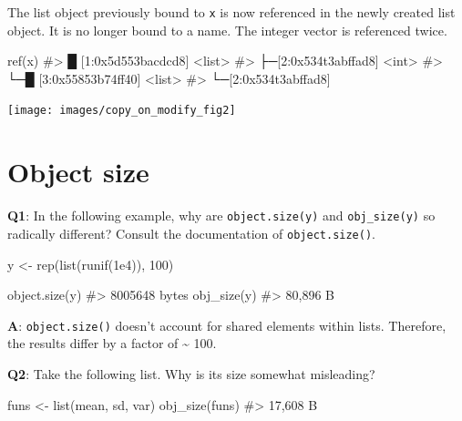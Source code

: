 \documentclass[
]{krantz}
\makeatletter
\newenvironment{Shaded}{\begin{snugshade}}{\end{snugshade}}
\newcommand{\CommentTok}[1]{\textcolor[rgb]{0.56,0.35,0.01}{\textit{#1}}}
\newcommand{\DecValTok}[1]{\textcolor[rgb]{0.00,0.00,0.81}{#1}}
\newcommand{\FloatTok}[1]{\textcolor[rgb]{0.00,0.00,0.81}{#1}}
\newcommand{\KeywordTok}[1]{\textcolor[rgb]{0.13,0.29,0.53}{\textbf{#1}}}
\newcommand{\NormalTok}[1]{#1}
\newcommand{\StringTok}[1]{\textcolor[rgb]{0.31,0.60,0.02}{#1}}
\newenvironment{kframe}{%
\medskip{}
\setlength{\fboxsep}{.8em}
 \def\at@end@of@kframe{}%
 \ifinner\ifhmode%
  \def\at@end@of@kframe{\end{minipage}}%
  \begin{minipage}{\columnwidth}%
 \fi\fi%
 \def\FrameCommand##1{\hskip\@totalleftmargin \hskip-\fboxsep
 \colorbox{shadecolor}{##1}\hskip-\fboxsep
     \hskip-\linewidth \hskip-\@totalleftmargin \hskip\columnwidth}%
 \MakeFramed {\advance\hsize-\width
   \@totalleftmargin\z@ \linewidth\hsize
   \@setminipage}}%
 {\par\unskip\endMakeFramed%
 \at@end@of@kframe}
\renewenvironment{Shaded}{\begin{kframe}}{\end{kframe}}
\renewcommand{\KeywordTok} [1]{\textcolor[rgb]{0.00,0.44,0.13}{{#1}}}
\renewcommand{\DecValTok}  [1]{\textcolor[rgb]{0.25,0.63,0.44}{{#1}}}
\renewcommand{\FloatTok}   [1]{\textcolor[rgb]{0.25,0.63,0.44}{{#1}}}
\renewcommand{\StringTok}  [1]{\textcolor[rgb]{0.25,0.44,0.63}{{#1}}}
\renewcommand{\CommentTok} [1]{\textcolor[rgb]{0.38,0.63,0.69}{{#1}}}
\renewcommand{\NormalTok}  [1]{{#1}}
\makeatother
\begin{document}
The list object previously bound to \texttt{x} is now referenced in the newly created list object. It is no longer bound to a name. The integer vector is referenced twice.

\begin{Shaded}
\begin{Highlighting}[]
\KeywordTok{ref}\NormalTok{(x)}
\CommentTok{#> █ [1:0x5d553bacdcd8] <list> }
\CommentTok{#> ├─[2:0x534t3abffad8] <int> }
\CommentTok{#> └─█ [3:0x55853b74ff40] <list> }
\CommentTok{#>   └─[2:0x534t3abffad8] }
\end{Highlighting}
\end{Shaded}

\begin{center}\texttt{[image: images/copy\_on\_modify\_fig2]} \end{center}

\hypertarget{object-size}{%
\section{Object size}\label{object-size}}

\textbf{{Q1}}: In the following example, why are \texttt{object.size(y)} and \texttt{obj\_size(y)} so radically different? Consult the documentation of \texttt{object.size()}.

\begin{Shaded}
\begin{Highlighting}[]
\NormalTok{y <-}\StringTok{ }\KeywordTok{rep}\NormalTok{(}\KeywordTok{list}\NormalTok{(}\KeywordTok{runif}\NormalTok{(}\FloatTok{1e4}\NormalTok{)), }\DecValTok{100}\NormalTok{)}

\KeywordTok{object.size}\NormalTok{(y)}
\CommentTok{#> 8005648 bytes}
\KeywordTok{obj_size}\NormalTok{(y)}
\CommentTok{#> 80,896 B}
\end{Highlighting}
\end{Shaded}

\textbf{{A}}: \texttt{object.size()} doesn't account for shared elements within lists. Therefore, the results differ by a factor of \textasciitilde{} 100.

\textbf{{Q2}}: Take the following list. Why is its size somewhat misleading?

\begin{Shaded}
\begin{Highlighting}[]
\NormalTok{funs <-}\StringTok{ }\KeywordTok{list}\NormalTok{(mean, sd, var)}
\KeywordTok{obj_size}\NormalTok{(funs)}
\CommentTok{#> 17,608 B}
\end{Highlighting}
\end{Shaded}
\end{document}
